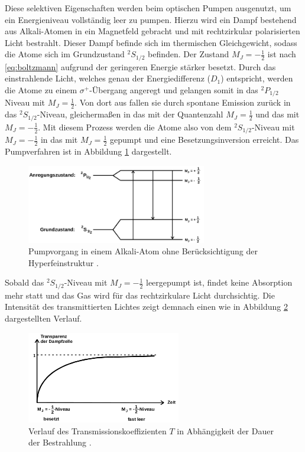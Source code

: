 Diese selektiven Eigenschaften werden beim optischen Pumpen ausgenutzt, um ein Energieniveau vollständig leer zu pumpen.
Hierzu wird ein Dampf bestehend aus Alkali-Atomen in ein Magnetfeld gebracht und mit rechtzirkular polarisierten Licht bestrahlt.
Dieser Dampf befinde sich im thermischen Gleichgewicht, sodass die Atome sich im Grundzustand $^2S_{1/2}$ befinden.
Der Zustand $M_J = -\frac{1}{2}$ ist nach \eqref{eq:boltzmann} aufgrund der geringeren Energie stärker besetzt.
Durch das einstrahlende Licht, welches genau der Energiedifferenz ($D_1$) entspricht, werden die Atome zu einem $\sigma^{+}$-Übergang angeregt und gelangen somit in das $^2P_{1/2}$ Niveau mit $M_J=\frac{1}{2}$.
Von dort aus fallen sie durch spontane Emission zurück in das $^2S_{1/2}$-Niveau, gleichermaßen in das mit der Quantenzahl $M_J = \frac{1}{2}$ und das mit $M_J=-\frac{1}{2}$.
Mit diesem Prozess werden die Atome also von dem $^2S_{1/2}$-Niveau mit $M_J=-\frac{1}{2}$ in das mit $M_J=\frac{1}{2}$ gepumpt und eine Besetzungsinversion erreicht.
Das Pumpverfahren ist in Abbildung \ref{fig:tfig4} dargestellt.
\FloatBarrier
\begin{figure}[h]
    \centering
    \includegraphics[width=0.7\textwidth]{pumpen.png}
    \caption{Pumpvorgang in einem Alkali-Atom ohne Berücksichtigung der Hyperfeinstruktur \cite{quelle01}.}
    \label{fig:tfig4}
\end{figure}
\FloatBarrier
\noindent
Sobald das $^2S_{1/2}$-Niveau mit $M_J=-\frac{1}{2}$ leergepumpt ist, findet keine Absorption mehr statt und das Gas wird für das rechtzirkulare Licht durchsichtig.
Die Intensität des transmittierten Lichtes zeigt demnach einen wie in Abbildung \ref{fig:tfig5} dargestellten Verlauf.
\FloatBarrier
\begin{figure}[h]
    \centering
    \includegraphics[width=0.6\textwidth]{transmission.png}
    \caption{Verlauf des Transmissionskoeffizienten $T$ in Abhängigkeit der Dauer der Bestrahlung \cite{quelle01}.}
    \label{fig:tfig5}
\end{figure}
\FloatBarrier
\noindent

